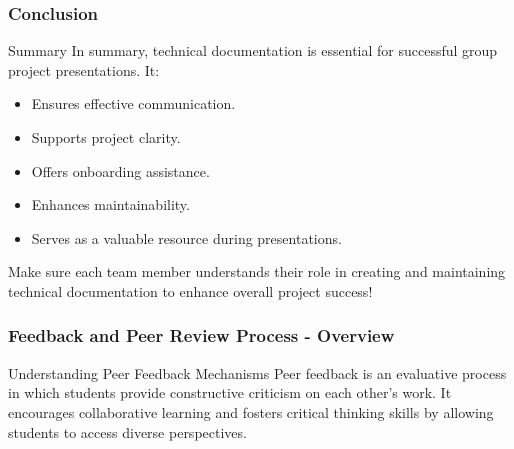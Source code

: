 \documentclass{beamer}
\begin{document}
\begin{frame}[fragile]
    \frametitle{Conclusion}
    \begin{block}{Summary}
        In summary, technical documentation is essential for successful group project presentations. It:
        \begin{itemize}
            \item Ensures effective communication.
            \item Supports project clarity.
            \item Offers onboarding assistance.
            \item Enhances maintainability.
            \item Serves as a valuable resource during presentations.
        \end{itemize}
    \end{block}
    Make sure each team member understands their role in creating and maintaining technical documentation to enhance overall project success!
\end{frame}

\begin{frame}[fragile]
    \frametitle{Feedback and Peer Review Process - Overview}
    \begin{block}{Understanding Peer Feedback Mechanisms}
        Peer feedback is an evaluative process in which students provide constructive criticism on each other's work. It encourages collaborative learning and fosters critical thinking skills by allowing students to access diverse perspectives.
    \end{block}
\end{frame}
\end{document}
